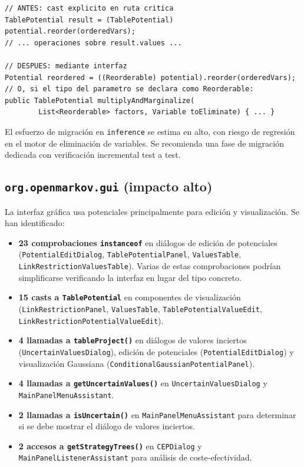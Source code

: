 \documentclass[11pt,a4paper]{article}
\newcommand{\code}[1]{\texttt{#1}}
\begin{document}
\begin{lstlisting}[caption={Ejemplo de migración en \code{VariableEliminationCore} (impacto alto)}]
// ANTES: cast explicito en ruta critica
TablePotential result = (TablePotential) potential.reorder(orderedVars);
// ... operaciones sobre result.values ...

// DESPUES: mediante interfaz
Potential reordered = ((Reorderable) potential).reorder(orderedVars);
// O, si el tipo del parametro se declara como Reorderable:
public TablePotential multiplyAndMarginalize(
        List<Reorderable> factors, Variable toEliminate) { ... }
\end{lstlisting}

El esfuerzo de migración en \code{inference} se estima en alto, con riesgo de
regresión en el motor de eliminación de variables.  Se recomienda una fase de
migración dedicada con verificación incremental test a test.

\subsection{\code{org.openmarkov.gui} (impacto alto)}
\label{sec:op3-gui}

La interfaz gráfica usa potenciales principalmente para edición y visualización.
Se han identificado:

\begin{itemize}
  \item \textbf{23 comprobaciones \code{instanceof}} en diálogos de edición
        de potenciales (\code{Potential\-Edit\-Dialog}, \code{Table\-Potential\-Panel},
        \code{ValuesTable}, \code{Link\-Restriction\-Values\-Table}).  Varias de estas
        comprobaciones podrían simplificarse verificando la interfaz en lugar
        del tipo concreto.

  \item \textbf{15 casts a \code{TablePotential}} en componentes de visualización
        (\code{LinkRestrictionPanel}, \code{ValuesTable},
        \code{TablePotentialValueEdit}, \code{LinkRestrictionPotentialValueEdit}).

  \item \textbf{4 llamadas a \code{tableProject()}} en diálogos de valores
        inciertos (\code{Uncertain\-Values\-Dialog}), edición de potenciales
        (\code{Potential\-Edit\-Dialog}) y visualización Gaussiana
        (\code{Conditional\-Gaussian\-Potential\-Panel}).

  \item \textbf{4 llamadas a \code{getUncertainValues()}} en
        \code{Uncertain\-Values\-Dialog} y \code{Main\-Panel\-Menu\-Assistant}.

  \item \textbf{2 llamadas a \code{isUncertain()}} en \code{MainPanelMenuAssistant}
        para determinar si se debe mostrar el diálogo de valores inciertos.

  \item \textbf{2 accesos a \code{getStrategyTrees()}} en
        \code{CEPDialog} y \code{MainPanelListenerAssistant} para análisis
        de coste-efectividad.
\end{itemize}
\end{document}

